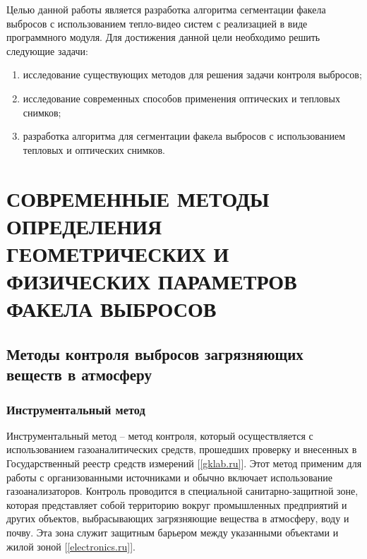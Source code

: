\documentclass[14pt, a4paper]{extreport}
\begin{document}
	Целью данной работы является разработка алгоритма сегментации факела выбросов с использованием тепло-видео систем с реализацией в виде программного модуля. Для достижения данной цели необходимо решить следующие задачи:
	\begin{enumerate}[label={\arabic*)}]
		\item исследование существующих методов для решения задачи контроля выбросов;
		\item исследование современных способов применения оптических и тепловых снимков;
		\item разработка алгоритма для сегментации факела выбросов с использованием тепловых и оптических снимков.
	\end{enumerate}
	
\chapter [\vspace*{-0.22cm}СОВРЕМЕННЫЕ МЕТОДЫ ОПРЕДЕЛЕНИЯ ГЕОМЕТРИЧЕСКИХ \hspace*{-0.5cm} И ФИЗИЧЕСКИХ ПАРАМЕТРОВ ФАКЕЛА ВЫБРОСОВ]{\vspace*{-0.22cm}СОВРЕМЕННЫЕ МЕТОДЫ ОПРЕДЕЛЕНИЯ ГЕОМЕТРИЧЕСКИХ И ФИЗИЧЕСКИХ ПАРАМЕТРОВ ФАКЕЛА ВЫБРОСОВ}
\section {Методы контроля выбросов загрязняющих веществ в атмосферу}
\subsection {Инструментальный метод}
	Инструментальный метод -- метод контроля, который осуществляется с использованием газоаналитических средств, прошедших проверку и внесенных в Государственный реестр средств измерений [\ref{gklab.ru}]. Этот метод применим для работы с организованными источниками и обычно включает использование газоанализаторов. Контроль проводится в специальной санитарно-защитной зоне, которая представляет собой территорию вокруг промышленных предприятий и других объектов, выбрасывающих загрязняющие вещества в атмосферу, воду и почву. Эта зона служит защитным барьером между указанными объектами и жилой зоной [\ref{electronics.ru}].
	
\end{document}
